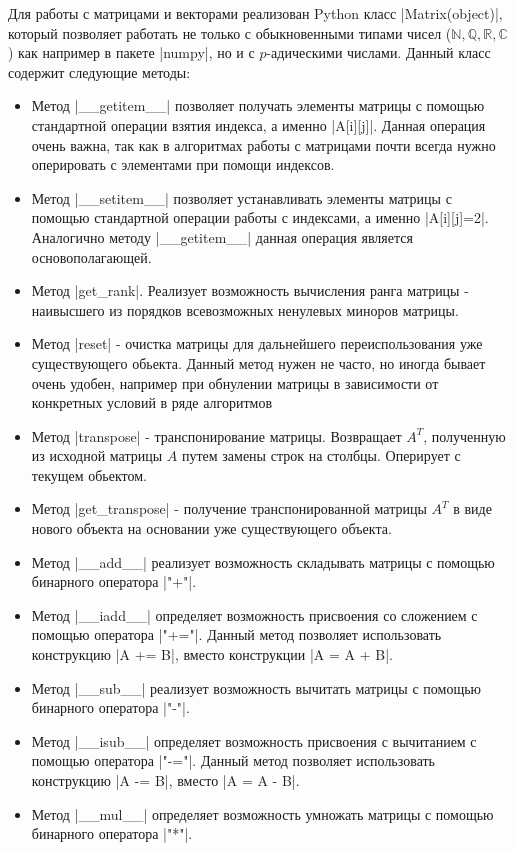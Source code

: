 \documentclass[master, och, diploma, times]{sty/SCWorks}
\theoremstyle{plain}
\theoremstyle{definition}
\numberwithin{equation}{section}
\begin{document}
Для работы с матрицами и векторами реализован Python класс |Matrix(object)|, который позволяет работать не только с обыкновенными типами чисел ($\mathbb{N}, \mathbb{Q}, \mathbb{R}, \mathbb{C}$) как например в пакете |numpy|, но и с $p$-адическими числами. Данный класс содержит следующие методы:

\begin{itemize}
\item Метод |__getitem__| позволяет получать элементы матрицы с помощью стандартной операции взятия индекса, а именно |A[i][j]|. Данная операция очень важна, так как в алгоритмах работы с матрицами почти всегда нужно оперировать с элементами при помощи индексов.
\item Метод |__setitem__| позволяет устанавливать элементы матрицы с помощью стандартной операции работы с индексами, а именно |A[i][j]=2|. Аналогично методу |__getitem__| данная операция является основополагающей.
\item Метод |get_rank|. Реализует возможность вычисления ранга матрицы - наивысшего из порядков всевозможных ненулевых миноров матрицы.
\item Метод |reset| - очистка матрицы для дальнейшего переиспользования уже существующего обьекта. Данный метод нужен не часто, но иногда бывает очень удобен, например при обнулении матрицы в зависимости от конкретных условий в ряде алгоритмов
\item Метод |transpose| - транспонирование матрицы. Возвращает $A^{T}$, полученную из исходной матрицы $A$ путем замены строк на столбцы. Оперирует с текущем обьектом.
\item Метод |get_transpose| - получение транспонированной матрицы $A^{T}$ в виде нового объекта на основании уже существующего объекта.
\item Метод |__add__| реализует возможность складывать матрицы с помощью бинарного оператора |"+"|.
\item Метод |__iadd__| определяет возможность присвоения со сложением с помощью оператора |"+="|. Данный метод позволяет использовать конструкцию |A += B|, вместо конструкции |A = A + B|.
\item Метод |__sub__| реализует возможность вычитать матрицы с помощью бинарного оператора |"-"|.
\item Метод |__isub__| определяет возможность присвоения с вычитанием с помощью оператора |"-="|. Данный метод позволяет использовать конструкцию |A -= B|, вместо |A = A - B|.
\item Метод |__mul__| определяет возможность умножать матрицы с помощью бинарного оператора |"*"|.

\end{itemize}
\end{document}
